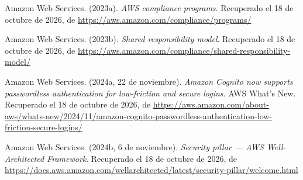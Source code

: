 \documentclass[12pt, a4paper]{article}
\begin{document}
\begin{list}{}{\setlength{\leftmargin}{1.27cm}\setlength{\itemindent}{-1.27cm}%
  \setlength{\labelwidth}{0pt}\setlength{\labelsep}{0pt}\setlength{\itemsep}{6pt}}

\item Amazon Web Services. (2023a). \textit{AWS compliance programs}. Recuperado el 18 de octubre de 2026, de \url{https://aws.amazon.com/compliance/programs/}


\item Amazon Web Services. (2023b). \textit{Shared responsibility model}. Recuperado el 18 de octubre de 2026, de \url{https://aws.amazon.com/compliance/shared-responsibility-model/}


\item Amazon Web Services. (2024a, 22 de noviembre). \textit{Amazon
  Cognito now supports passwordless authentication for low-friction
  and secure logins}. AWS What's New.
  Recuperado el 18 de octubre de 2026, de \url{https://aws.amazon.com/about-aws/whats-new/2024/11/amazon-cognito-passwordless-authentication-low-friction-secure-logins/}
 
 
\item Amazon Web Services. (2024b, 6 de noviembre). \textit{Security
  pillar --- AWS Well-Architected Framework}.
  Recuperado el 18 de octubre de 2026, de \url{https://docs.aws.amazon.com/wellarchitected/latest/security-pillar/welcome.html}
 


\end{list}
\end{document}
